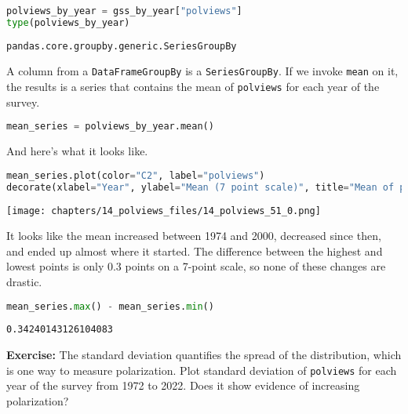 \begin{lstlisting}[language=Python,style=source]
polviews_by_year = gss_by_year["polviews"]
type(polviews_by_year)
\end{lstlisting}

\begin{lstlisting}[style=output]
pandas.core.groupby.generic.SeriesGroupBy
\end{lstlisting}

A column from a \passthrough{\lstinline!DataFrameGroupBy!} is a
\passthrough{\lstinline!SeriesGroupBy!}. If we invoke
\passthrough{\lstinline!mean!} on it, the results is a series that
contains the mean of \passthrough{\lstinline!polviews!} for each year of
the survey.

\begin{lstlisting}[language=Python,style=source]
mean_series = polviews_by_year.mean()
\end{lstlisting}

And here's what it looks like.

\begin{lstlisting}[language=Python,style=source]
mean_series.plot(color="C2", label="polviews")
decorate(xlabel="Year", ylabel="Mean (7 point scale)", title="Mean of polviews")
\end{lstlisting}

\begin{center}
\texttt{[image: chapters/14\_polviews\_files/14\_polviews\_51\_0.png]}
\end{center}

It looks like the mean increased between 1974 and 2000, decreased since
then, and ended up almost where it started. The difference between the
highest and lowest points is only 0.3 points on a 7-point scale, so none
of these changes are drastic.

\begin{lstlisting}[language=Python,style=source]
mean_series.max() - mean_series.min()
\end{lstlisting}

\begin{lstlisting}[style=output]
0.34240143126104083
\end{lstlisting}

\textbf{Exercise:} The standard deviation quantifies the spread of the
distribution, which is one way to measure polarization. Plot standard
deviation of \passthrough{\lstinline!polviews!} for each year of the
survey from 1972 to 2022. Does it show evidence of increasing
polarization?


